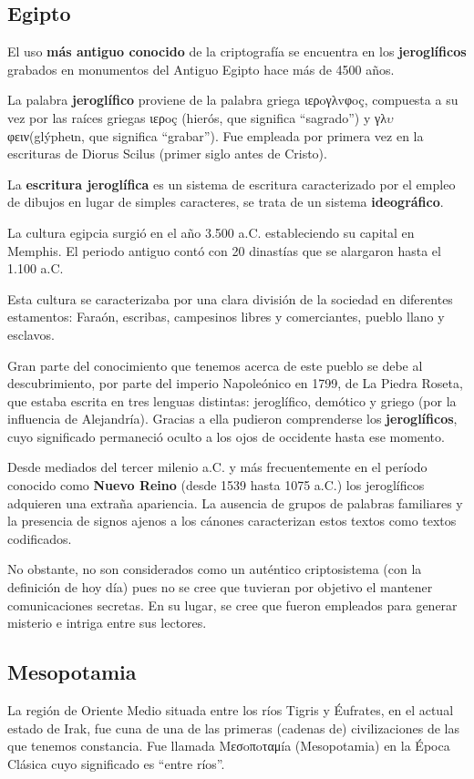 \documentclass[nochap]{apuntesURJC}
\begin{document}
\subsection{Egipto}
El uso \textbf{más antiguo conocido} de la criptografía se encuentra en los \textbf{jeroglíficos} grabados en monumentos del Antiguo Egipto hace más de 4500 años.

La palabra \textbf{jeroglífico} proviene de la palabra griega ιερoγλvφoç, compuesta a su vez por las raíces griegas ιερoç (hierós, que significa ``sagrado'') y γλ$\upsilon$φειν(glýpheιn, que significa ``grabar''). Fue empleada por primera vez en la escrituras de Diorus Scilus (primer siglo antes de Cristo).

La \textbf{escritura jeroglífica} es un sistema de escritura caracterizado por el empleo de dibujos en lugar de simples caracteres, se trata de un sistema \textbf{ideográfico}.

La cultura egipcia surgió en el año 3.500 a.C. estableciendo su capital en Memphis. El periodo antiguo contó con 20 dinastías que se alargaron hasta el 1.100 a.C.

Esta cultura se caracterizaba por una clara división de la sociedad en diferentes estamentos: Faraón, escribas, campesinos libres y comerciantes, pueblo llano y esclavos.

Gran parte del conocimiento que tenemos acerca de este pueblo se debe al descubrimiento, por parte del imperio Napoleónico en 1799, de La Piedra Roseta, que estaba escrita en tres lenguas distintas: jeroglífico, demótico y griego (por la influencia de Alejandría). Gracias a ella pudieron comprenderse los \textbf{jeroglíficos}, cuyo significado permaneció oculto a los ojos de occidente hasta ese momento.


Desde mediados del tercer milenio a.C. y más frecuentemente en el período conocido como \textbf{Nuevo Reino} (desde 1539 hasta 1075 a.C.) los jeroglíficos adquieren una extraña apariencia. La ausencia de grupos de palabras familiares y la presencia de signos ajenos a los cánones caracterizan estos textos como textos codificados.

No obstante, no son considerados como un auténtico criptosistema (con la definición de hoy día) pues no se cree que tuvieran por objetivo el mantener comunicaciones secretas. En su lugar, se cree que fueron empleados para generar misterio e intriga entre sus lectores.

\subsection{Mesopotamia}
La región de Oriente Medio situada entre los ríos Tigris y Éufrates, en el actual estado de Irak, fue cuna de una de las primeras (cadenas de) civilizaciones de las que tenemos constancia. Fue llamada Mεσoπoταμía (Mesopotamia) en la Época Clásica cuyo significado es ``entre ríos''.
\end{document}
